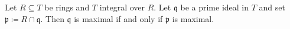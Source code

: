 Let $R \subseteq T$ be rings and $T$ integral over $R$. Let $\mathfrak{q}$ be a
prime ideal in $T$ and set $\mathfrak{p}\coloneqq R\cap \mathfrak{q}$. Then
$\mathfrak{q}$ is maximal if and only if $\mathfrak{p}$ is maximal.
